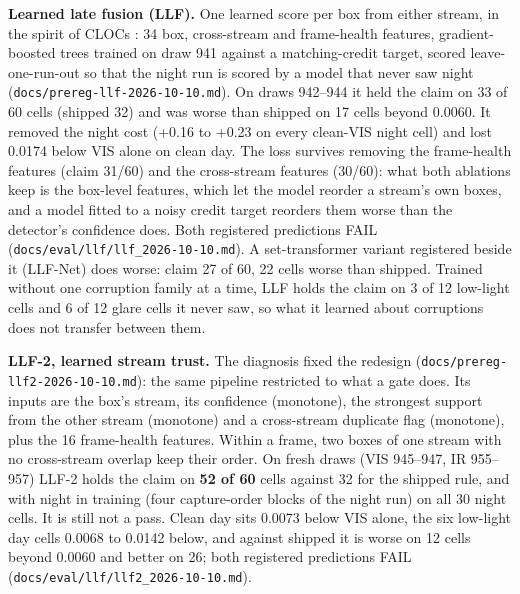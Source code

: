 \documentclass[10pt]{article}
\begin{document}
\textbf{Learned late fusion (LLF).} One learned score per box from either stream, in the spirit of CLOCs \citep{pang2020clocs}: 34 box, cross-stream and frame-health features, gradient-boosted trees trained on draw 941 against a matching-credit target, scored leave-one-run-out so that the night run is scored by a model that never saw night (\texttt{docs/\allowbreak{}prereg-llf-2026-10-10.md}). On draws 942--944 it held the claim on 33 of 60 cells (shipped 32) and was worse than shipped on 17 cells beyond 0.0060. It removed the night cost (+0.16 to +0.23 on every clean-VIS night cell) and lost 0.0174 below VIS alone on clean day. The loss survives removing the frame-health features (claim 31/60) and the cross-stream features (30/60): what both ablations keep is the box-level features, which let the model reorder a stream's own boxes, and a model fitted to a noisy credit target reorders them worse than the detector's confidence does. Both registered predictions FAIL (\texttt{docs/\allowbreak{}eval/\allowbreak{}llf/\allowbreak{}llf\_\allowbreak{}2026-10-10.md}). A set-transformer variant registered beside it (LLF-Net) does worse: claim 27 of 60, 22 cells worse than shipped. Trained without one corruption family at a time, LLF holds the claim on 3 of 12 low-light cells and 6 of 12 glare cells it never saw, so what it learned about corruptions does not transfer between them.

\textbf{LLF-2, learned stream trust.} The diagnosis fixed the redesign (\texttt{docs/\allowbreak{}prereg-llf2-2026-10-10.md}): the same pipeline restricted to what a gate does. Its inputs are the box's stream, its confidence (monotone), the strongest support from the other stream (monotone) and a cross-stream duplicate flag (monotone), plus the 16 frame-health features. Within a frame, two boxes of one stream with no cross-stream overlap keep their order. On fresh draws (VIS 945--947, IR 955--957) LLF-2 holds the claim on \textbf{52 of 60} cells against 32 for the shipped rule, and with night in training (four capture-order blocks of the night run) on all 30 night cells. It is still not a pass. Clean day sits 0.0073 below VIS alone, the six low-light day cells 0.0068 to 0.0142 below, and against shipped it is worse on 12 cells beyond 0.0060 and better on 26; both registered predictions FAIL (\texttt{docs/\allowbreak{}eval/\allowbreak{}llf/\allowbreak{}llf2\_\allowbreak{}2026-10-10.md}).
\end{document}
